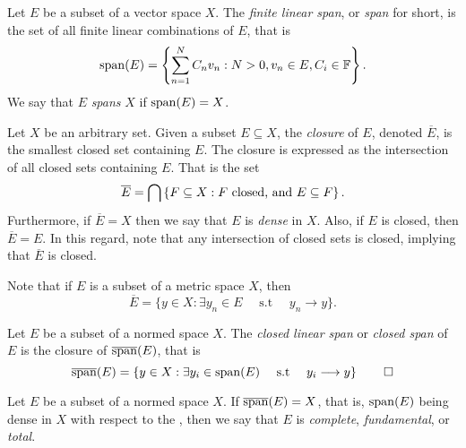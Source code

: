 \documentclass[../thesis.tex]{subfiles}
\begin{document}
\begin{definition}[Span]\label{def:span}
    Let $E$ be a subset of a vector space $X$. The \emph{finite linear span}, or \emph{span} for short, is the set of all finite linear combinations of $E$, that is
    \begin{equation*}
        \operatorname{span}(E)=\left\{\sum_{n=1}^N C_n v_n : N>0, v_n \in E, C_i \in \mathbb{F}\right\}.
    \end{equation*}
    We say that $E$ \emph{spans} $X$ if $\operatorname{span}(E) = X$.
\end{definition}

\begin{definition}[Closure]\label{def:closure}
    Let $X$ be an arbitrary set. Given a subset $E \subseteq X$, the \emph{closure} of $E$, denoted $\overline{E}$, is the smallest closed set containing $E$. The closure is expressed as the intersection of all closed sets containing $E$. That is the set
    \begin{equation*}
        \overline{E} = \bigcap \left\{F \subseteq X : F \text{ closed, and } E \subseteq F\right\}.
    \end{equation*}
    Furthermore, if $\overline{E} = X$ then we say that $E$ is \emph{dense} in $X$. Also, if $E$ is closed, then $\overline{E}=E$. In this regard, note that any intersection of closed sets is closed, implying that $\overline{E}$ is closed.
\end{definition}
\begin{remark}
    Note that if $E$ is a subset of a metric space $X$, then
    \begin{equation*}
        \overline{E} = \{ y \in X : \exists y_n\in E \quad \text{ s.t }\quad y_n \longrightarrow y\}.
    \end{equation*}
\end{remark}

\begin{definition}\label{def:closed_span}
    Let $E$ be a subset of a normed space $X$. The \emph{closed linear span} or \emph{closed span} of $E$ is the closure of $\overline{\operatorname{span}}(E)$, that is
    \begin{equation*}
        \overline{\operatorname{span}}(E) = \left\{y\in X: \exists y_i\in \operatorname{span}(E) \quad \text{ s.t } \quad y_i \longrightarrow y\right\} \qedhere
    \end{equation*}
\end{definition}



\begin{definition}[Complete]\label{def:complete}
    Let $E$ be a subset of a normed space $X$. If $\overline{\operatorname{span}}(E) = X$, that is, $\operatorname{span}(E)$ being dense in $X$ with respect to the \GenNormX, then we say that $E$ is \emph{complete}, \emph{fundamental}, or \emph{total}.
\end{definition}
\end{document}
